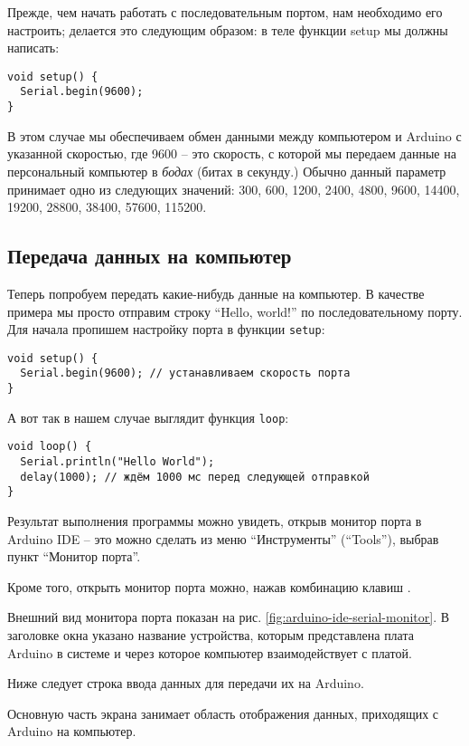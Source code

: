 \documentclass[../sparc.tex]{subfiles}
\begin{document}
Прежде, чем начать работать с последовательным портом, нам необходимо его
настроить; делается это следующим образом: в теле функции setup мы должны
написать:

\begin{verbatim}
void setup() {
  Serial.begin(9600);
}
\end{verbatim}

В этом случае мы обеспечиваем обмен данными между компьютером и Arduino с
указанной скоростью, где 9600 -- это скорость, с которой мы передаем данные на
персональный компьютер в \emph{бодах} (битах в секунду.) Обычно данный параметр
принимает одно из следующих значений: 300, 600, 1200, 2400, 4800, 9600, 14400,
19200, 28800, 38400, 57600, 115200.

\subsection{Передача данных на компьютер}

Теперь попробуем передать какие-нибудь данные на компьютер. В качестве примера
мы просто отправим строку ``Hello, world!'' по последовательному порту. Для
начала пропишем настройку порта в функции \texttt{setup}:

\begin{verbatim}
void setup() {
  Serial.begin(9600); // устанавливаем скорость порта
}
\end{verbatim}

А вот так в нашем случае выглядит функция \texttt{loop}:

\begin{verbatim}
void loop() {
  Serial.println("Hello World");
  delay(1000); // ждём 1000 мс перед следующей отправкой
}
\end{verbatim}

Результат выполнения программы можно увидеть, открыв монитор порта в Arduino IDE
-- это можно сделать из меню ``Инструменты'' (``Tools''), выбрав пункт ``Монитор
порта''.

Кроме того, открыть монитор порта можно, нажав комбинацию клавиш .

Внешний вид монитора порта показан на рис. \ref{fig:arduino-ide-serial-monitor}.
В заголовке окна указано название устройства, которым представлена плата Arduino
в системе и через которое компьютер взаимодействует с платой.

Ниже следует строка ввода данных для передачи их на Arduino.

Основную часть экрана занимает область отображения данных, приходящих с Arduino
на компьютер.
\end{document}
